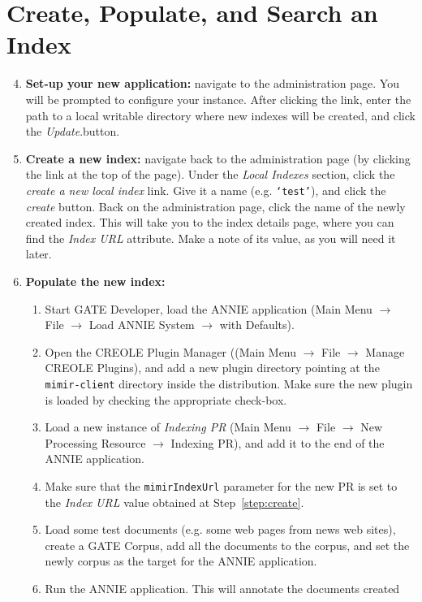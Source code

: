 \section{Create, Populate, and Search an Index}
%
\begin{enumerate}
\setcounter{enumi}{3}
  \item {\bf Set-up your new \Mimir{} application:}
  navigate to the administration page. You will be prompted to configure your
  \Mimir{} instance. After clicking the link, enter the path to a local writable directory
  where new indexes will be created, and click the {\em Update}.button.
  \item \label{step:create} {\bf Create a new index:} navigate back to the
  administration page (by clicking the link at the top of the page). Under the {\em Local Indexes}
  section, click the {\em create a new local index} link. Give it a name (e.g.
  {\tt `test'}), and click the {\em create} button. Back on the administration
  page, click the name of the newly created index. This will take you to the
  index details page, where you can find the {\em Index URL} attribute. Make a
  note of its value, as you will need it later.
  \item {\bf Populate the new index:} 
  \begin{enumerate}
    \item Start GATE Developer, load the ANNIE application (Main Menu 
    $\rightarrow$ File $\rightarrow$ Load ANNIE System $\rightarrow$ with
    Defaults).
    \item Open the CREOLE Plugin Manager ((Main Menu $\rightarrow$ File
    $\rightarrow$ Manage CREOLE Plugins), and add a new plugin directory
    pointing at the {\tt mimir-client} directory inside the \Mimir{}
    distribution. Make sure the new plugin is loaded by checking the
    appropriate check-box.
    \item Load a new instance of {\em \Mimir{} Indexing PR} (Main Menu
    $\rightarrow$ File $\rightarrow$ New Processing Resource $\rightarrow$
    \Mimir{} Indexing PR), and add it to the end of the ANNIE application.
    \item Make sure that the {\tt mimirIndexUrl} parameter for the new PR is set
    to the {\em Index URL} value obtained at Step~\ref{step:create}.
    \item Load some test documents (e.g. some web pages from news web sites),
    create a GATE Corpus, add all the documents to the corpus, and set the
    newly corpus as the target for the ANNIE application.
    \item Run the ANNIE application. This will annotate the documents created

\end{enumerate}
\end{enumerate}
